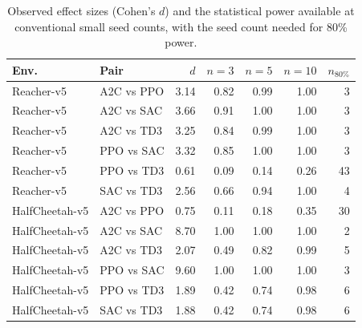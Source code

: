 \begin{table}[t]
\centering
\caption{Observed effect sizes (Cohen's $d$) and the statistical power available at conventional small seed counts, with the seed count needed for 80\% power.}
\label{tab:power}
\begin{tabular}{llrrrrr}
\toprule
Env. & Pair & $d$ & $n{=}3$ & $n{=}5$ & $n{=}10$ & $n_{80\%}$ \\
\midrule
Reacher-v5 & A2C vs PPO & 3.14 & 0.82 & 0.99 & 1.00 & 3 \\
Reacher-v5 & A2C vs SAC & 3.66 & 0.91 & 1.00 & 1.00 & 3 \\
Reacher-v5 & A2C vs TD3 & 3.25 & 0.84 & 0.99 & 1.00 & 3 \\
Reacher-v5 & PPO vs SAC & 3.32 & 0.85 & 1.00 & 1.00 & 3 \\
Reacher-v5 & PPO vs TD3 & 0.61 & 0.09 & 0.14 & 0.26 & 43 \\
Reacher-v5 & SAC vs TD3 & 2.56 & 0.66 & 0.94 & 1.00 & 4 \\
HalfCheetah-v5 & A2C vs PPO & 0.75 & 0.11 & 0.18 & 0.35 & 30 \\
HalfCheetah-v5 & A2C vs SAC & 8.70 & 1.00 & 1.00 & 1.00 & 2 \\
HalfCheetah-v5 & A2C vs TD3 & 2.07 & 0.49 & 0.82 & 0.99 & 5 \\
HalfCheetah-v5 & PPO vs SAC & 9.60 & 1.00 & 1.00 & 1.00 & 3 \\
HalfCheetah-v5 & PPO vs TD3 & 1.89 & 0.42 & 0.74 & 0.98 & 6 \\
HalfCheetah-v5 & SAC vs TD3 & 1.88 & 0.42 & 0.74 & 0.98 & 6 \\
\bottomrule
\end{tabular}
\end{table}